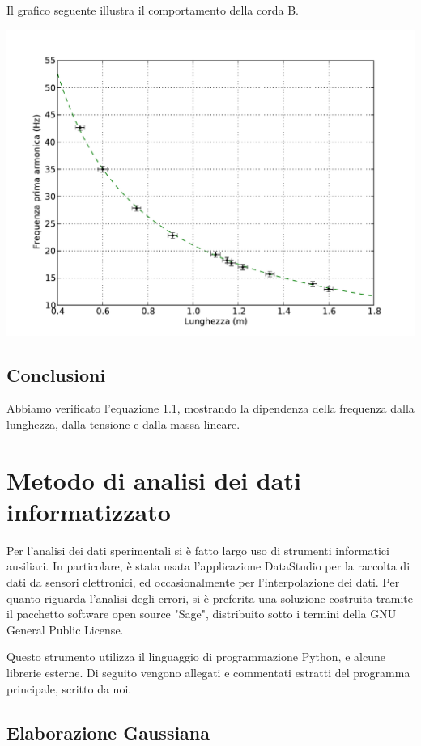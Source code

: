 Il grafico seguente illustra il comportamento della corda B.

\includegraphics[scale=0.75]{"../grafici/CordaPrimaArmonica"}


\section{Conclusioni}

Abbiamo verificato l'equazione 1.1, mostrando la dipendenza della frequenza dalla lunghezza, dalla tensione e dalla massa lineare.




\addappheadtotoc
{}
\chapter{Metodo di analisi dei dati informatizzato}
Per l'analisi dei dati sperimentali si è fatto largo uso di strumenti informatici ausiliari.
In particolare, è stata usata l'applicazione DataStudio per la raccolta di dati da sensori elettronici, ed occasionalmente per l'interpolazione dei dati.
Per quanto riguarda l'analisi degli errori, si è preferita una soluzione costruita tramite il pacchetto software open source "Sage", distribuito sotto i termini della GNU General Public License.

Questo strumento utilizza il linguaggio di programmazione Python, e alcune librerie esterne. Di seguito vengono allegati e commentati estratti del programma principale, scritto da noi.

\section{Elaborazione Gaussiana}

